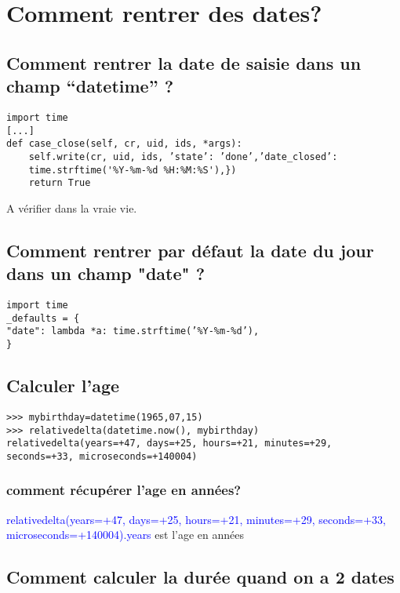\documentclass[12pt,a4paper]{article}
\begin{document}
\section{Comment rentrer des dates?}
\label{renterdate}

\subsection{ Comment rentrer la date de saisie dans un champ “datetime” ?}
\label{sec:defaultnow}


\begin{verbatim}
import time
[...]
def case_close(self, cr, uid, ids, *args):
    self.write(cr, uid, ids, ’state’: ’done’,’date_closed’:
    time.strftime('%Y-%m-%d %H:%M:%S'),})
    return True
\end{verbatim}
A vérifier dans la vraie vie.

\subsection{ Comment rentrer par défaut la date du jour dans un champ "date" ?}
\label{sec:defaultnowdate}

\begin{verbatim}
import time
_defaults = {
"date": lambda *a: time.strftime(’%Y-%m-%d’),
}
\end{verbatim}


\subsection{Calculer l'age }
\label{sec:age}


\begin{verbatim}
>>> mybirthday=datetime(1965,07,15)
>>> relativedelta(datetime.now(), mybirthday)
relativedelta(years=+47, days=+25, hours=+21, minutes=+29, seconds=+33, microseconds=+140004)
\end{verbatim}

\subsubsection{comment récupérer l'age en années?}
\label{sec:years}

\textcolor{blue}{relativedelta(years=+47, days=+25, hours=+21, minutes=+29, seconds=+33, microseconds=+140004).years} est l'age en années

\subsection{Comment calculer la durée quand on a 2 dates}
\label{sec:duree}
\end{document}
